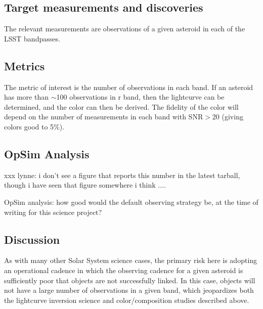 
\subsection{Target measurements and discoveries}
\label{sec:\secname:targets}

The relevant measurements are observations of
a given asteroid in each of the LSST bandpasses.



\subsection{Metrics}
\label{sec:\secname:metrics}

The metric of interest is the number
of observations in each band. If an asteroid has
more than $\sim$100 observations in r band,
then the lightcurve can be determined, and the
color can then be derived. The fidelity of the color
will depend on the number of measurements in
each band with SNR$>$20 (giving colors good to
5\%).




\subsection{OpSim Analysis}
\label{sec:\secname:analysis}

xxx
lynne: i don't see a figure that reports this number
in the latest tarball, though i have seen that figure
somewhere i think ....

OpSim analysis: how good would the default observing strategy be, at
the time of writing for this science project?



\subsection{Discussion}
\label{sec:\secname:discussion}

As with many other Solar System science cases, the primary
risk here is adopting an operational cadence in which
the observing cadence for a given asteroid is sufficiently
poor that objects are not successfully linked. In this case,
objects will not have a large number of observations
in a given band, which jeopardizes both the lightcurve
inversion science and color/composition studies described
above.

